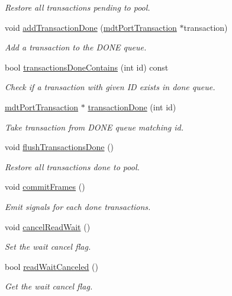 \begin{DoxyCompactItemize}
\begin{DoxyCompactList}\small\item\em Restore all transactions pending to pool. \end{DoxyCompactList}\item 
void \hyperlink{classmdt_port_manager_a4b584d9005316be9991e6026e4c5e5a4}{addTransactionDone} (\hyperlink{classmdt_port_transaction}{mdtPortTransaction} $\ast$transaction)
\begin{DoxyCompactList}\small\item\em Add a transaction to the DONE queue. \end{DoxyCompactList}\item 
\hypertarget{classmdt_port_manager_a3293066f4c3ed2e4b116f28dca8c5d64}{
bool \hyperlink{classmdt_port_manager_a3293066f4c3ed2e4b116f28dca8c5d64}{transactionsDoneContains} (int id) const }
\label{classmdt_port_manager_a3293066f4c3ed2e4b116f28dca8c5d64}

\begin{DoxyCompactList}\small\item\em Check if a transaction with given ID exists in done queue. \end{DoxyCompactList}\item 
\hyperlink{classmdt_port_transaction}{mdtPortTransaction} $\ast$ \hyperlink{classmdt_port_manager_a5869bcf6774a86fb9d3b00a0d4211bb5}{transactionDone} (int id)
\begin{DoxyCompactList}\small\item\em Take transaction from DONE queue matching id. \end{DoxyCompactList}\item 
\hypertarget{classmdt_port_manager_aad801de5f93a3619d98b7ea3cae6b999}{
void \hyperlink{classmdt_port_manager_aad801de5f93a3619d98b7ea3cae6b999}{flushTransactionsDone} ()}
\label{classmdt_port_manager_aad801de5f93a3619d98b7ea3cae6b999}

\begin{DoxyCompactList}\small\item\em Restore all transactions done to pool. \end{DoxyCompactList}\item 
void \hyperlink{classmdt_port_manager_a84d37b380080eb26e56c68424dedd958}{commitFrames} ()
\begin{DoxyCompactList}\small\item\em Emit signals for each done transactions. \end{DoxyCompactList}\item 
void \hyperlink{classmdt_port_manager_a016996e823cc729eb1f595307f3dd1cf}{cancelReadWait} ()
\begin{DoxyCompactList}\small\item\em Set the wait cancel flag. \end{DoxyCompactList}\item 
bool \hyperlink{classmdt_port_manager_a83ade128d6e70f7216355e9df840c2a6}{readWaitCanceled} ()
\begin{DoxyCompactList}\small\item\em Get the wait cancel flag. \end{DoxyCompactList}\end{DoxyCompactItemize}
